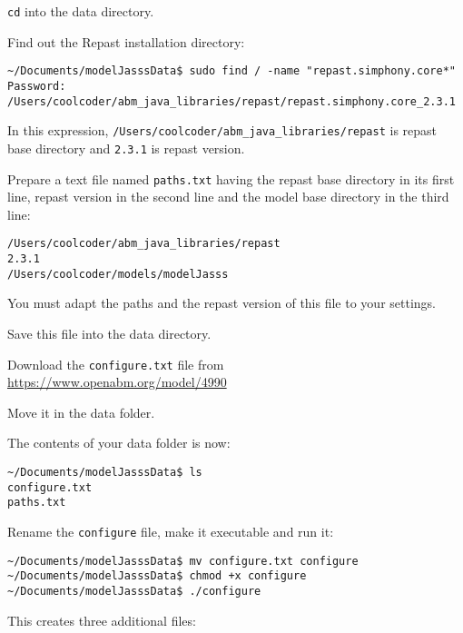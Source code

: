 \documentclass{article}
\begin{document}
\verb+cd+ into the data directory.

Find out the Repast installation directory:

\vskip2mm
\noindent\verb+~/Documents/modelJasssData$ +\color{red}\verb+sudo find / -name "repast.simphony.core*"+ \color{black}
\verb+Password:+ \\ \color{blue}
\verb+/Users/coolcoder/abm_java_libraries/repast/repast.simphony.core_2.3.1 +\\
\color{black}
\vskip2mm

In this expression, \verb+/Users/coolcoder/abm_java_libraries/repast+ is repast base directory and \verb+2.3.1+ is repast version.

Prepare a text file named \verb+paths.txt+ having the repast base directory in its first line, repast version in the second line and the model base directory in the third line:

\color{magenta}
\vskip2mm \noindent
\verb+/Users/coolcoder/abm_java_libraries/repast+ \\
\verb+2.3.1+ \\
\verb+/Users/coolcoder/models/modelJasss+
\vskip2mm

\color{black}
You must adapt the paths and the repast version of this file to your settings.

Save this file into the data directory.

\vskip2mm
Download the \verb+configure.txt+ file from \\
\url{https://www.openabm.org/model/4990}

Move it in the data folder.

The contents of your data folder is now:

\vskip2mm
\noindent\verb+~/Documents/modelJasssData$ +\color{red}\verb+ls+ \color{blue}\\
\verb+configure.txt+ \\
\verb+paths.txt+
\color{black}

\vskip2mm
Rename the \verb+configure+ file, make it executable and run it:

\vskip2mm
\noindent\verb+~/Documents/modelJasssData$ +\color{red}\verb|mv configure.txt configure| \color{black}\\
\noindent\verb+~/Documents/modelJasssData$ +\color{red}\verb|chmod +x configure| \color{black}\\
\verb+~/Documents/modelJasssData$ +\color{red}\verb|./configure| \color{black}

\vskip2mm
This creates three additional files:
\end{document}
